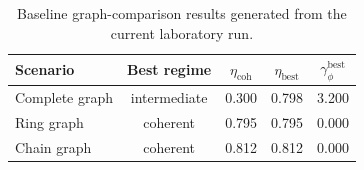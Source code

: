 \begin{table}[t]
\centering
\caption{Baseline graph-comparison results generated from the current laboratory run.}
\begin{tabular}{lcccc}
\toprule
Scenario & Best regime & $\eta_{\mathrm{coh}}$ & $\eta_{\mathrm{best}}$ & $\gamma_{\phi}^{\mathrm{best}}$ \\
\midrule
Complete graph & intermediate & 0.300 & 0.798 & 3.200 \\
Ring graph & coherent & 0.795 & 0.795 & 0.000 \\
Chain graph & coherent & 0.812 & 0.812 & 0.000 \\
\bottomrule
\end{tabular}
\end{table}
